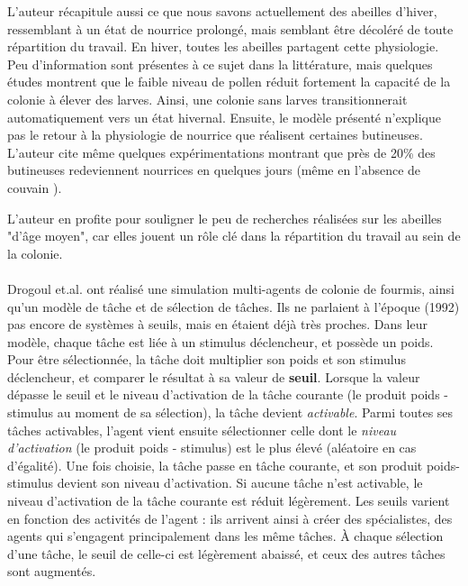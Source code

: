         L'auteur récapitule aussi ce que nous savons actuellement des abeilles d'hiver, ressemblant à un état de nourrice prolongé, mais semblant être décoléré de toute répartition du travail. En hiver, toutes les abeilles partagent cette physiologie. Peu d'information sont présentes à ce sujet dans la littérature, mais quelques études montrent que le faible niveau de pollen réduit fortement la capacité de la colonie à élever des larves. Ainsi, une colonie sans larves transitionnerait automatiquement vers un état hivernal. Ensuite, le modèle présenté n'explique pas le retour à la physiologie de nourrice que réalisent certaines butineuses. L'auteur cite même quelques expérimentations montrant que près de 20\% des butineuses redeviennent nourrices en quelques jours (même en l'absence de couvain \cite{huang_regulation_1996}).
        
        L'auteur en profite pour souligner le peu de recherches réalisées sur les abeilles "d'âge moyen", car elles jouent un rôle clé dans la répartition du travail au sein de la colonie.
        
        \paragraph{}
        Drogoul et.al. \cite{drogoul_multi-agent_1992} ont réalisé une simulation multi-agents de colonie de fourmis, ainsi qu'un modèle de tâche et de sélection de tâches. Ils ne parlaient à l'époque (1992) pas encore de systèmes à seuils, mais en étaient déjà très proches. Dans leur modèle, chaque tâche est liée à un stimulus déclencheur, et possède un poids. Pour être sélectionnée, la tâche doit multiplier son poids et son stimulus déclencheur, et comparer le résultat à sa valeur de \textbf{seuil}. Lorsque la valeur dépasse le seuil et le niveau d'activation de la tâche courante (le produit poids - stimulus au moment de sa sélection), la tâche devient \textit{activable}. Parmi toutes ses tâches activables, l'agent vient ensuite sélectionner celle dont le \textit{niveau d'activation} (le produit poids - stimulus) est le plus élevé (aléatoire en cas d'égalité). Une fois choisie, la tâche passe en tâche courante, et son produit poids-stimulus devient son niveau d'activation. Si aucune tâche n'est activable, le niveau d'activation de la tâche courante est réduit légèrement. Les seuils varient en fonction des activités de l'agent : ils arrivent ainsi à créer des spécialistes, des agents qui s'engagent principalement dans les même tâches. À chaque sélection d'une tâche, le seuil de celle-ci est légèrement abaissé, et ceux des autres tâches sont augmentés.
        
